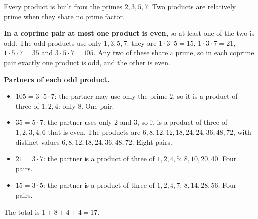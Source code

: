 Every product is built from the primes $2,3,5,7$. Two products are relatively prime when they share no prime factor.

\textbf{In a coprime pair at most one product is even,} so at least one of the two is odd. The odd products use only $1,3,5,7$: they are $1\cdot3\cdot5=15$, $1\cdot3\cdot7=21$, $1\cdot5\cdot7=35$ and $3\cdot5\cdot7=105$. Any two of these share a prime, so in each coprime pair exactly one product is odd, and the other is even.

\textbf{Partners of each odd product.}
\begin{itemize}
\item $105=3\cdot5\cdot7$: the partner may use only the prime $2$, so it is a product of three of $1,2,4$: only $8$. One pair.
\item $35=5\cdot7$: the partner uses only $2$ and $3$, so it is a product of three of $1,2,3,4,6$ that is even. The products are $6,8,12,12,18,24,24,36,48,72$, with distinct values $6,8,12,18,24,36,48,72$. Eight pairs.
\item $21=3\cdot7$: the partner is a product of three of $1,2,4,5$: $8,10,20,40$. Four pairs.
\item $15=3\cdot5$: the partner is a product of three of $1,2,4,7$: $8,14,28,56$. Four pairs.
\end{itemize}
The total is $1+8+4+4=\boxed{17}$.
